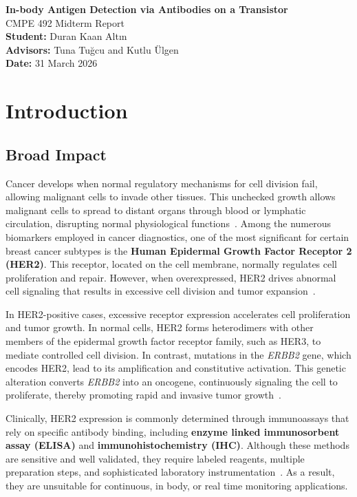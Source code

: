 \documentclass[12pt,a4paper]{report}
\begin{document}
\onehalfspacing

\begin{titlepage}
\centering
\vspace*{2cm}
\Huge\textbf{In-body Antigen Detection via Antibodies on a Transistor}\\[1cm]
\large CMPE 492 Midterm Report\\[2cm]
\textbf{Student:} Duran Kaan Altın \\
\textbf{Advisors:} Tuna Tuğcu and Kutlu Ülgen\\
\textbf{Date:} 31 March 2026
\end{titlepage}

\tableofcontents
\newpage

\chapter{Introduction}

\section{Broad Impact}

Cancer develops when normal regulatory mechanisms for cell division fail, allowing malignant cells to invade other tissues. This unchecked growth allows malignant cells to spread to distant organs through blood or lymphatic circulation, disrupting normal physiological functions~\cite{janeway2001}. Among the numerous biomarkers employed in cancer diagnostics, one of the most significant for certain breast cancer subtypes is the \textbf{Human Epidermal Growth Factor Receptor 2 (HER2)}. This receptor, located on the cell membrane, normally regulates cell proliferation and repair. However, when overexpressed, HER2 drives abnormal cell signaling that results in excessive cell division and tumor expansion~\cite{yarden2001}.

In HER2-positive cases, excessive receptor expression accelerates cell proliferation and tumor growth. In normal cells, HER2 forms heterodimers with other members of the epidermal growth factor receptor family, such as HER3, to mediate controlled cell division. In contrast, mutations in the \textit{ERBB2} gene, which encodes HER2, lead to its amplification and constitutive activation. This genetic alteration converts \textit{ERBB2} into an oncogene, continuously signaling the cell to proliferate, thereby promoting rapid and invasive tumor growth~\cite{kabel2017}.

Clinically, HER2 expression is commonly determined through immunoassays that rely on specific antibody binding, including \textbf{enzyme linked immunosorbent assay (ELISA)} and \textbf{immunohistochemistry (IHC)}. Although these methods are sensitive and well validated, they require labeled reagents, multiple preparation steps, and sophisticated laboratory instrumentation~\cite{harpaz2017,janeway2001ch9}. As a result, they are unsuitable for continuous, in body, or real time monitoring applications.
\end{document}
